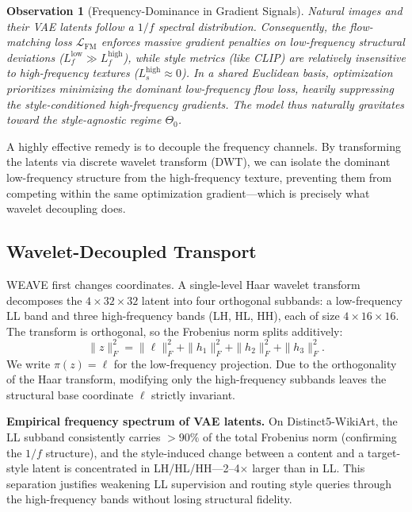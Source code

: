 \documentclass[letterpaper]{article}
\newtheorem{observation}{Observation}
\begin{document}
\begin{observation}[Frequency-Dominance in Gradient Signals]
\label{prop:attractor}
Natural images and their VAE latents follow a $1/f$ spectral distribution.
Consequently, the flow-matching loss $\mathcal L_{\mathrm{FM}}$ enforces massive gradient penalties on low-frequency structural deviations ($L_f^{\mathrm{low}} \gg L_f^{\mathrm{high}}$), while style metrics (like CLIP) are relatively insensitive to high-frequency textures ($L_s^{\mathrm{high}} \approx 0$).
In a shared Euclidean basis, optimization prioritizes minimizing the dominant low-frequency flow loss, heavily suppressing the style-conditioned high-frequency gradients.
The model thus naturally gravitates toward the style-agnostic regime $\Theta_0$.
\end{observation}

A highly effective remedy is to decouple the frequency channels.
By transforming the latents via discrete wavelet transform (DWT), we can isolate the dominant low-frequency structure from the high-frequency texture, preventing them from competing within the same optimization gradient---which is precisely what wavelet decoupling does.

\subsection{Wavelet-Decoupled Transport}
\label{sec:fiberbundle}

WEAVE first changes coordinates.
A single-level Haar wavelet transform decomposes the $4{\times}32{\times}32$ latent into four orthogonal subbands: a low-frequency LL band and three high-frequency bands (LH, HL, HH), each of size $4{\times}16{\times}16$.
The transform is orthogonal, so the Frobenius norm splits additively:
\begin{equation}
\|z\|_F^2 = \|\ell\|_F^2 + \|h_1\|_F^2 + \|h_2\|_F^2 + \|h_3\|_F^2.
\end{equation}
We write $\pi(z)=\ell$ for the low-frequency projection.
Due to the orthogonality of the Haar transform, modifying only the high-frequency subbands leaves the structural base coordinate $\ell$ strictly invariant.

\textbf{Empirical frequency spectrum of VAE latents.}
On Distinct5-WikiArt, the LL subband consistently carries $>\!90\%$ of the total Frobenius norm (confirming the $1/f$ structure), and the style-induced change between a content and a target-style latent is concentrated in LH/HL/HH---2--4$\times$ larger than in LL.
This separation justifies weakening LL supervision and routing style queries through the high-frequency bands without losing structural fidelity.
\end{document}
